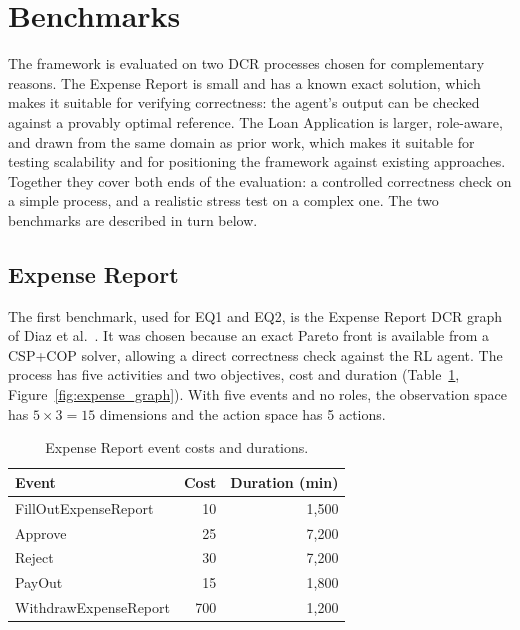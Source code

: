 
\section{Benchmarks}
\label{sec:benchmarks}
The framework is evaluated on two \ac{DCR} processes chosen for
complementary reasons. The Expense Report is small and has a known
exact solution, which makes it suitable for verifying correctness: the
agent's output can be checked against a provably optimal reference. The
Loan Application is larger, role-aware, and drawn from the same domain
as prior work, which makes it suitable for testing scalability and for
positioning the framework against existing approaches. Together they
cover both ends of the evaluation: a controlled correctness check on a
simple process, and a realistic stress test on a complex one. The two
benchmarks are described in turn below.

\subsection{Expense Report}
\label{sec:expense_dataset}

The first benchmark, used for EQ1 and EQ2, is the Expense Report
\ac{DCR} graph of Diaz et
al.~\cite{Diaz2024Pareto-OptimalModels}. It was chosen because an exact
Pareto front is available from a CSP+COP solver, allowing a direct
correctness check against the \ac{RL} agent. The process has five
activities and two objectives, cost and duration
(Table~\ref{tab:expense_costs}, Figure~\ref{fig:expense_graph}). With
five events and no roles, the observation space has $5 \times 3 = 15$
dimensions and the action space has 5 actions.

\begin{table}[H]
\centering
\renewcommand{\arraystretch}{1.6}
\setlength{\tabcolsep}{16pt}
\caption{Expense Report event costs and durations.}
\label{tab:expense_costs}
\begin{tabular}{lrr}
\toprule
\textbf{Event} & \textbf{Cost} & \textbf{Duration (min)} \\
\midrule
FillOutExpenseReport  & 10  & 1{,}500 \\
Approve               & 25  & 7{,}200 \\
Reject                & 30  & 7{,}200 \\
PayOut                & 15  & 1{,}800 \\
WithdrawExpenseReport & 700 & 1{,}200 \\
\bottomrule
\end{tabular}
\end{table}

